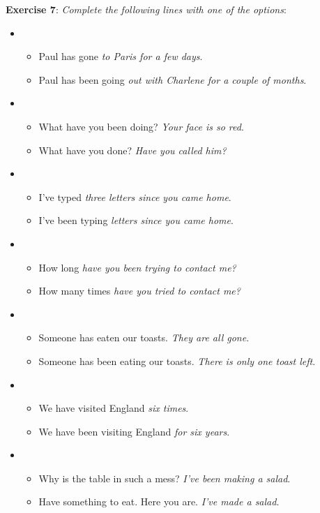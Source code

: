 \textbf{Exercise 7}: \textit{Complete the following lines with one of the options}:

\begin{itemize}

\item
\begin{itemize}
\item Paul has gone \textit{to Paris for a few days}.
\item Paul has been going \textit{out with Charlene for a couple of months}.
\end{itemize}

\item
\begin{itemize}
\item What have you been doing? \textit{Your face is so red}.
\item What have you done? \textit{Have you called him?}
\end{itemize}

\item
\begin{itemize}
\item I've typed \textit{three letters since you came home}.
\item I've been typing \textit{letters since you came home}.
\end{itemize}

\item
\begin{itemize}
\item How long \textit{have you been trying to contact me?}
\item How many times \textit{have you tried to contact me?}
\end{itemize}

\item
\begin{itemize}
\item Someone has eaten our toasts. \textit{They are all gone}.
\item Someone has been eating our toasts. \textit{There is only one toast left}.
\end{itemize}

\item
\begin{itemize}
\item We have visited England \textit{six times}.
\item We have been visiting England \textit{for six years}.
\end{itemize}

\item
\begin{itemize}
\item Why is the table in such a mess? \textit{I've been making a salad}.
\item Have something to eat. Here you are. \textit{I've made a salad}.
\end{itemize}

\end{itemize}


